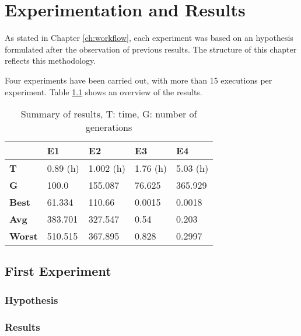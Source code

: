 \chapter{Experimentation and Results}\label{ch:res}
As stated in Chapter \ref{ch:workflow}, each experiment was based on an hypothesis formulated after the observation of previous results. The structure of this chapter reflects this methodology.

Four experiments have been carried out, with more than 15 executions per experiment. Table \ref{t:resOver} shows an overview of the results.
\begin{table}
	\myfloatalign
	\begin{tabularx}{\textwidth}{XXXXX} \toprule
		& \textbf{E1} & \textbf{E2} & \textbf{E3} &\textbf{E4} \\ \midrule
		\textbf{T} & 0.89 (h) & 1.002 (h) & 1.76 (h) & 5.03 (h) \\ \midrule
		\textbf{G} &  100.0 & 155.087 & 76.625 & 365.929 \\ \midrule
		\textbf{Best} & 61.334 & 110.66 & 0.0015 & 0.0018 \\ \midrule
		\textbf{Avg} & 383.701 & 327.547 & 0.54 &  0.203 \\ \midrule
		\textbf{Worst}  & 510.515 & 367.895 & 0.828 & 0.2997\\ \midrule

		\bottomrule
	\end{tabularx}
	\caption{Summary of results, T: time, G: number of generations}
	\label{t:resOver}
\end{table}

\section{First Experiment}
\subsection{Hypothesis}
\subsection{Results}

